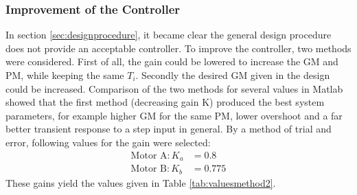 \documentclass[a4paper,kul]{kulakarticle} %
\begin{document}
\newpage
\subsubsection{Improvement of the Controller}
In section \ref{sec:designprocedure}, it became clear the general design procedure does not provide an acceptable controller. To improve the controller, two methods were considered. First of all, the gain could be lowered to increase the GM and PM, while keeping the same $T_i$. Secondly the desired GM given in the design could be increased. Comparison of the two methods for several values in Matlab showed that the first method (decreasing gain K) produced the best system parameters, for example higher GM for the same PM, lower overshoot and a far better transient response to a step input in general. By a method of trial and error, following values for the gain were selected: 
\begin{equation}
	\begin{split}
	\text{Motor A}: K_a &= 0.8\\
	\text{Motor B}: K_b &= 0.775
	\end{split}
\end{equation}
These gains yield the values given in Table \ref{tab:valuesmethod2}. 
\end{document}
